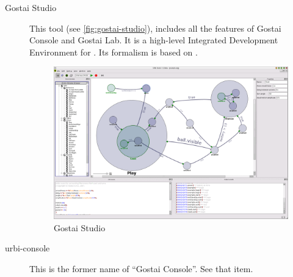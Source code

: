 \begin{description}
\item[Gostai Studio] This tool (see \autoref{fig:gostai-studio}),
  includes all the features of Gostai Console and Gostai Lab.  It is a
  high-level Integrated Development Environment for \urbi.  Its
  formalism is based on .

  \begin{figure}[htp]
    \centering
    \includegraphics[width=.8\linewidth]{img/gostai-studio}
    \caption{Gostai Studio}
    \label{fig:gostai-studio}
  \end{figure}

\item[urbi-console] This is the former name of ``Gostai Console''.
  See that item.
\end{description}


